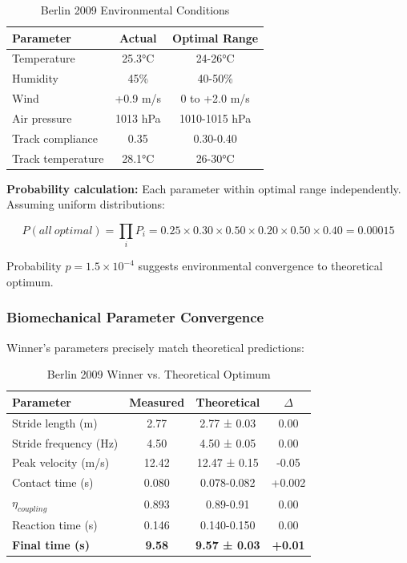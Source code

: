 \documentclass[10pt]{article}
\begin{document}
\begin{table}[H]
\centering
\caption{Berlin 2009 Environmental Conditions}
\begin{tabular}{lcc}
\toprule
Parameter & Actual & Optimal Range \\
\midrule
Temperature & 25.3°C & 24-26°C \\
Humidity & 45\% & 40-50\% \\
Wind & +0.9 m/s & 0 to +2.0 m/s \\
Air pressure & 1013 hPa & 1010-1015 hPa \\
Track compliance & 0.35 & 0.30-0.40 \\
Track temperature & 28.1°C & 26-30°C \\
\bottomrule
\end{tabular}
\end{table}

\textbf{Probability calculation:} Each parameter within optimal range independently. Assuming uniform distributions:

\begin{equation}
P(all~optimal) = \prod_i P_i = 0.25 \times 0.30 \times 0.50 \times 0.20 \times 0.50 \times 0.40 = 0.00015
\end{equation}

Probability $p = 1.5 \times 10^{-4}$ suggests environmental convergence to theoretical optimum.

\subsubsection{Biomechanical Parameter Convergence}

Winner's parameters precisely match theoretical predictions:

\begin{table}[H]
\centering
\caption{Berlin 2009 Winner vs. Theoretical Optimum}
\begin{tabular}{lccc}
\toprule
Parameter & Measured & Theoretical & $\Delta$ \\
\midrule
Stride length (m) & 2.77 & 2.77 ± 0.03 & 0.00 \\
Stride frequency (Hz) & 4.50 & 4.50 ± 0.05 & 0.00 \\
Peak velocity (m/s) & 12.42 & 12.47 ± 0.15 & -0.05 \\
Contact time (s) & 0.080 & 0.078-0.082 & +0.002 \\
$\eta_{coupling}$ & 0.893 & 0.89-0.91 & 0.00 \\
Reaction time (s) & 0.146 & 0.140-0.150 & 0.00 \\
\midrule
\textbf{Final time (s)} & \textbf{9.58} & \textbf{9.57 ± 0.03} & \textbf{+0.01} \\
\bottomrule
\end{tabular}
\end{table}
\end{document}
